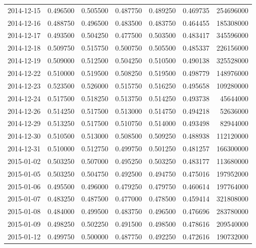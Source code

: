 \begin{tabular}{lrrrrrr}
2014-12-15 &    0.496500 &    0.505500 &    0.487750 &    0.489250 &    0.469735 &   254696000 \\
2014-12-16 &    0.488750 &    0.496500 &    0.483500 &    0.483750 &    0.464455 &   185308000 \\
2014-12-17 &    0.493500 &    0.504250 &    0.477500 &    0.503500 &    0.483417 &   345596000 \\
2014-12-18 &    0.509750 &    0.515750 &    0.500750 &    0.505500 &    0.485337 &   226156000 \\
2014-12-19 &    0.509000 &    0.512500 &    0.504250 &    0.510500 &    0.490138 &   325528000 \\
2014-12-22 &    0.510000 &    0.519500 &    0.508250 &    0.519500 &    0.498779 &   148976000 \\
2014-12-23 &    0.523500 &    0.526000 &    0.515750 &    0.516250 &    0.495658 &   109280000 \\
2014-12-24 &    0.517500 &    0.518250 &    0.513750 &    0.514250 &    0.493738 &    45644000 \\
2014-12-26 &    0.514250 &    0.517500 &    0.513000 &    0.514750 &    0.494218 &    52636000 \\
2014-12-29 &    0.513250 &    0.517500 &    0.510750 &    0.514000 &    0.493498 &    82944000 \\
2014-12-30 &    0.510500 &    0.513000 &    0.508500 &    0.509250 &    0.488938 &   112120000 \\
2014-12-31 &    0.510000 &    0.512750 &    0.499750 &    0.501250 &    0.481257 &   166300000 \\
2015-01-02 &    0.503250 &    0.507000 &    0.495250 &    0.503250 &    0.483177 &   113680000 \\
2015-01-05 &    0.503250 &    0.504750 &    0.492500 &    0.494750 &    0.475016 &   197952000 \\
2015-01-06 &    0.495500 &    0.496000 &    0.479250 &    0.479750 &    0.460614 &   197764000 \\
2015-01-07 &    0.483250 &    0.487500 &    0.477000 &    0.478500 &    0.459414 &   321808000 \\
2015-01-08 &    0.484000 &    0.499500 &    0.483750 &    0.496500 &    0.476696 &   283780000 \\
2015-01-09 &    0.498250 &    0.502250 &    0.491500 &    0.498500 &    0.478616 &   209540000 \\
2015-01-12 &    0.499750 &    0.500000 &    0.487750 &    0.492250 &    0.472616 &   190732000 \\

\end{tabular}
